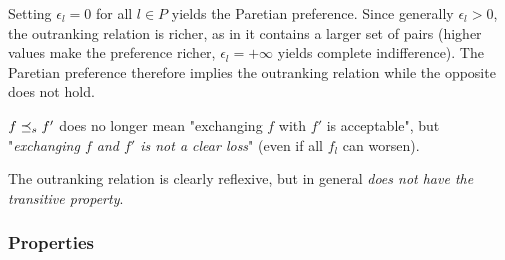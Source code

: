 Setting $\epsilon_l = 0$ for all $l \in P$ yields the Paretian preference. Since generally $\epsilon_l > 0$, the outranking relation is richer, as in it contains a larger set of pairs (higher values make the preference richer, $\epsilon_l = + \infty$ yields complete indifference). The Paretian preference therefore implies the outranking relation while the opposite does not hold.

$f \preceq_{s} f'$ does no longer mean "exchanging $f$ with $f'$ is acceptable", but "\textit{exchanging $f$ and $f'$ is not a clear loss}" (even if all $f_l$ can worsen).

The outranking relation is clearly reflexive, but in general \textit{does not have the transitive property}.

\subsubsection{Properties}

